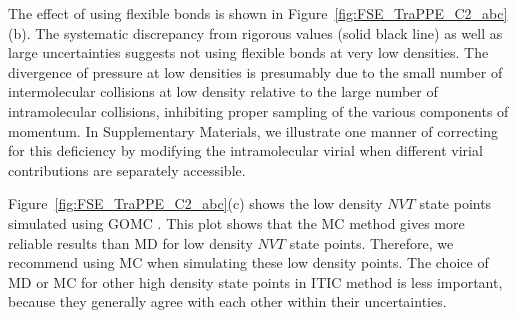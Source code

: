 \documentclass[5p,times]{elsarticle}
\begin{document}
The effect of using flexible bonds is shown in Figure~\ref{fig:FSE_TraPPE_C2_abc}(b). The systematic discrepancy from rigorous values (solid black line) as well as large uncertainties suggests not using flexible bonds at very low densities. The divergence of pressure at low densities is presumably due to the small number of intermolecular collisions at low density relative to the large number of intramolecular collisions, inhibiting proper sampling of the various components of momentum. In Supplementary Materials, we illustrate one manner of correcting for this deficiency by modifying the intramolecular virial when different virial contributions are separately accessible.

Figure~\ref{fig:FSE_TraPPE_C2_abc}(c) shows the low density $NVT$ state points simulated using GOMC \cite{Mick2013}. This plot shows that the MC method gives more reliable results than MD for low density $NVT$ state points. 
Therefore, we recommend using MC when simulating these low density points. The choice of MD or MC for other high density state points in ITIC method is less important, because they generally agree with each other within their uncertainties. %
\end{document}
